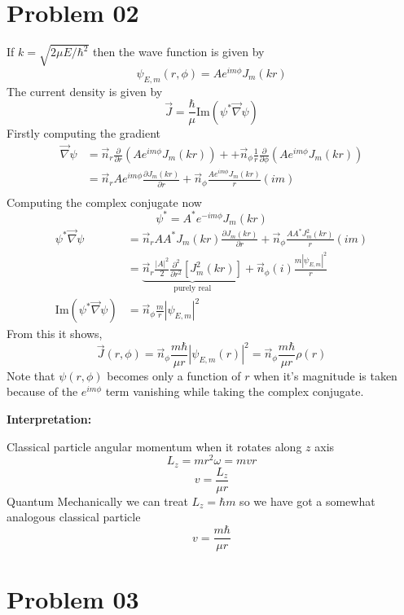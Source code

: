 \documentclass[letter, 10pts]{article}
\newcommand{\hb}{\hbar}
\begin{document}
\section*{Problem 02} 
If $k = \sqrt{2 \mu E / \hb ^2} $ then the wave function is given by 
\[
	\psi_{E,m}(r, \phi) = 
	A e ^{i m \phi} J_m (kr)
\] 
The current density is given by 
\[
\vec{J} = 
\frac{\hb}{\mu} \text{Im} \left(\psi ^{*} \vec{\nabla} \psi\right)
\]
Firstly computing the gradient 
\begin{align*}
	\vec{\nabla} \psi &= 
\vec{n}_r \frac{\partial}{\partial r} 
	\left(A e ^{i m \phi} J_m (kr)\right) + 
	+ 
	\vec{n}_\phi \frac{1}{r} 
	\frac{\partial }{\partial \phi}
	\left(A e ^{i m \phi} J_m (kr)\right)  \\ 
	&= 
\vec{n}_r A e^{i m \phi} 
\frac{\partial J_m(kr)}{\partial r} 
+ 
\vec{n}_\phi \frac{A e^{im \phi}J_m(kr)}{r}(i m)
	\\
\end{align*}
Computing the complex conjugate now 
\[
\psi^{*} = A^{*} e^{- i m \phi} J_m (kr)
\]
\begin{align*}
	\psi^{*} \vec{\nabla} \psi &= \vec{n}_r A A^{*} J_m(kr) 
\frac{\partial J_m(kr)}{\partial r}
+ 
\vec{n}_\phi \frac{A A^{*} J_m^2(kr)}{r}(i m)
				\\ &=
	\underbrace{
\vec{n}_r 
\frac{|A|^2}{2} \frac{\partial ^2}{\partial r ^2} [J^2_m(kr)]}_{\text{purely real}} + \vec{n}_\phi \left(i\right)
	\frac{m|\psi_{E,m}|^2} {r} \\ 
	\text{Im} \left(\psi ^{*} \vec{\nabla} \psi \right) &= \vec{n}_\phi \frac{m}{r} |\psi_{E,m} | ^2
\end{align*}
From this it shows, 
\[
	\vec{J} (r,\phi) = \vec{n}_\phi \frac{m \hb }{ \mu r} |\psi_{E,m}(r)|^2  = 
	\vec{n}_\phi \frac{m \hb }{ \mu r} \rho(r)
\]
Note that $\psi(r,\phi)$ becomes only a function of $r$ when it's magnitude is taken because of the $e^{i m \phi}$ term vanishing while taking the complex conjugate.

\textbf{Interpretation:}

Classical particle angular momentum when it rotates along $z$ axis 
\[
L _z = m r^2 \omega  = m v r
\] 
\[
v = \frac{L_z}{\mu r}
\] 
Quantum Mechanically we can treat $L_z = \hb m$ so we have got a somewhat analogous classical particle 
\[
v = \frac{m \hb}{\mu r}
\] 

\section*{Problem 03}
\end{document}
